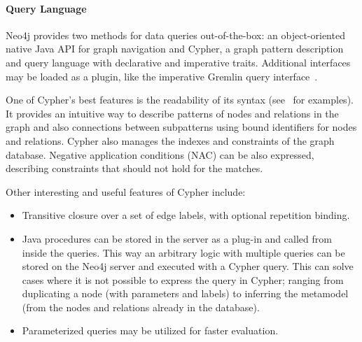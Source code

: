 \paragraph{Query Language}
Neo4j provides two methods for data queries out-of-the-box: an object-oriented native Java API for graph navigation and Cypher, a graph pattern description and query language with declarative and imperative traits. Additional interfaces may be loaded as a plugin, like the imperative Gremlin query interface~\cite{neo4j-gremlin-plugin}.

One of Cypher's best features is the readability of its syntax (see~ for examples). It provides an intuitive way to describe patterns of nodes and relations in the graph and also connections between subpatterns using bound identifiers for nodes and relations. Cypher also manages the indexes and constraints of the graph database. Negative application conditions (NAC) can be also expressed, describing constraints that should not hold for the matches.

Other interesting and useful features of Cypher include:
\begin{itemize}[topsep=0pt]
  \item Transitive closure over a set of edge labels, with optional repetition binding.

  \item Java procedures can be stored in the server as a plug-in and called from inside the queries. This way an arbitrary logic with multiple queries can be stored on the Neo4j server and executed with a Cypher query. This can solve cases where it is not possible to express the query in Cypher; ranging from duplicating a node (with parameters and labels) to inferring the metamodel (from the nodes and relations already in the database).
  \item Parameterized queries may be utilized for faster evaluation.
\end{itemize}

